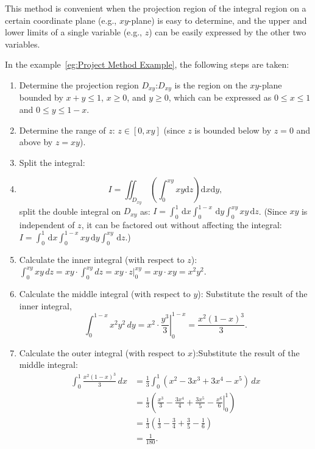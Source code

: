\documentclass[11pt]{../../TexTemplate/elegantbook}
\begin{document}
\begin{description}
This method is convenient when the projection region of the integral region on 
a certain coordinate plane (e.g., \(xy\)-plane) is easy to determine, 
and the upper and lower limits of a single variable (e.g., \(z\)) can 
be easily expressed by the other two variables.

In the example~\ref{eg:Project Method Example}, the following steps are taken:
\begin{enumerate}
    \item Determine the projection region \(D_{xy}\):\(D_{xy}\) is the region on the \(xy\)-plane 
        bounded by \(x + y \leqslant 1\), \(x \geq 0\), and \(y \geq 0\), 
        which can be expressed as \(0 \leqslant x \leqslant 1\) and \(0 \leqslant y \leqslant 1 - x\).
    \item Determine the range of \(z\): \(z \in [0, xy]\) (since \(z\) is bounded below by \(z = 0\) and above by \(z = xy\)).
    \item Split the integral: 
    \item 
        \[
        I = \iint_{D_{xy}}\, \left( \int_{0}^{xy} xy \mathrm{d}z \right)  \mathrm{d}x \mathrm{d}y,
        \]
        split the double integral on \(D_{xy}\) as:
        \(I = \int_{0}^{1} \, \mathrm{d}x \int_{0}^{1 - x} \, \mathrm{d}y  \int_{0}^{xy} xy \, \mathrm{d}z\).
        (Since \(xy\) is independent of \(z\), it can be factored out without affecting the integral:
        \(I = \int_{0}^{1} \, \mathrm{d}x \int_{0}^{1 - x} xy \, \mathrm{d}y  \int_{0}^{xy} \, \mathrm{d}z\).)
    \item Calculate the inner integral (with respect to \(z\)):
        \(\int_{0}^{xy} xy \, dz = xy \cdot \int_{0}^{xy} dz 
        = xy \cdot \left. z \right|_{0}^{xy} = xy \cdot xy = x^2 y^2\).
    \item Calculate the middle integral (with respect to \(y\)):
        Substitute the result of the inner integral,
        \[
        \int_{0}^{1 - x} x^2 y^2 \, dy 
        = x^2 \cdot \left. \frac{y^3}{3} \right|_{0}^{1 - x} = \frac{x^2 (1 - x)^3}{3}.
        \]
    \item Calculate the outer integral (with respect to \(x\)):Substitute the result of the middle integral:
        \begin{align*}
            \int_{0}^{1} \frac{x^2 (1 - x)^3}{3} \, dx &= \frac{1}{3} \int_{0}^{1} (x^2 - 3x^3 + 3x^4 - x^5) \, dx \\
            &= \frac{1}{3} \left( \left. \frac{x^3}{3} - \frac{3x^4}{4} + \frac{3x^5}{5} - \frac{x^6}{6} \right|_{0}^{1} \right) \\
            &= \frac{1}{3} \left( \frac{1}{3} - \frac{3}{4} + \frac{3}{5} - \frac{1}{6} \right) \\
            &= \frac{1}{180}.
        \end{align*}
\end{enumerate}
\end{description}
\end{document}
